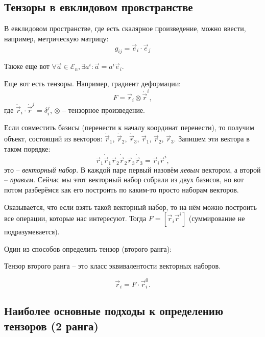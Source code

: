 \subsection{Тензоры в евклидовом провстранстве}

В евклидовом пространстве, где есть скалярное произведение, можно ввести, например, метрическую
матрицу:
\[
  g_{ij} = \vec{e}_i \cdot \vec{e}_j
\]

Также еще вот $\forall \vec{a} \in \mathcal{E}_n, \exists a^i :  \vec{a} = a^i \vec{e}_i$.

Еще вот есть тензоры. Например, градиент деформации:
\[
  F = \vec{r}_i \otimes \mathring{\vec{r}}^i,
\]
где $\mathring{\vec{r}}_i \cdot \mathring{\vec{r}}^j = \delta_i^j$,
  $\otimes$ -- тензорное произведение.

Если совместить базисы (перенести к началу координат перенести), то получим объект, состоящий
из векторов: $\mathring{\vec{r}}_1$, $\mathring{\vec{r}}_2$, $\mathring{\vec{r}}_3$, $\vec{r}_1$,
$\vec{r}_2$, $\vec{r}_3$. Запишем эти вектора в таком порядке:
\[
  \vec{r}_1 \mathring{\vec{r}}_1 \vec{r}_2 \mathring{\vec{r}}_2 \vec{r}_3 \mathring{\vec{r}}_3 = \vec{r}_i \vec{r}^i,
\]
это -- \emph{векторный набор}. В каждой паре первый назовём \emph{левым} вектором, а
второй -- \emph{правым}. Сейчас мы этот векторный набор собрали из двух базисов, но вот потом
разберёмся как его построить по каким-то просто наборам векторов. 

Оказывается, что если взять такой векторный набор, то на нём можно построить все операции, которые
нас интересуют. Тогда $F = [\vec{r}_i \vec{r}^i]$ (суммирование не подразумевается).

Один из способов определить тензор (второго ранга):
\begin{definition}
  Тензор второго ранга -- это класс эквивалентости векторных наборов.
\end{definition}

\[
  \vec{r}_i = F \cdot \vec{r}_i^0.
\]


\subsection{Наиболее основные подходы к определению тензоров (2 ранга)}

